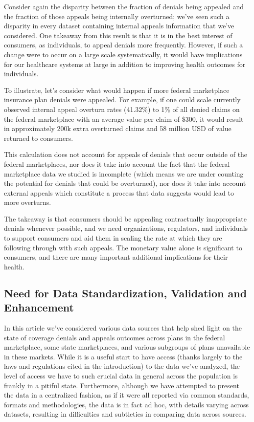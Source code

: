 \documentclass[12pt, a4paper,twoside]{report}
\theoremstyle{plain} %
\theoremstyle{definition} %
\theoremstyle{remark} %
\numberwithin{equation}{chapter}
\begin{document}
		Consider again the disparity between the fraction of denials being appealed and the fraction of those appeals being internally overturned; we've seen such a disparity in every dataset containing internal appeals information that we've considered. One takeaway from this result is that it is in the best interest of consumers, as individuals, to appeal denials more frequently. However, if such a change were to occur on a large scale systematically, it would have implications for our healthcare systems at large in addition to improving health outcomes for individuals.
		
		To illustrate, let's consider what would happen if more federal marketplace insurance plan denials were appealed. For example, if one could scale currently observed internal appeal overturn rates (41.32\%) to 1\% of all denied claims on the federal marketplace with an average value per claim of \$300, it would result in approximately 200k extra overturned claims and 58 million USD of value returned to consumers.
		
		This calculation does not account for appeals of denials that occur outside of the federal marketplaces, nor does it take into account the fact that the federal marketplace data we studied is incomplete (which means we are under counting the potential for denials that could be overturned), nor does it take into account external appeals which constitute a process that data suggests would lead to more overturns.
		
		The takeaway is that consumers should be appealing contractually inappropriate denials whenever possible, and we need organizations, regulators, and individuals to support consumers and aid them in scaling the rate at which they are following through with such appeals. The monetary value alone is significant to consumers, and there are many important additional implications for their health.
		
		\subsection{Need for Data Standardization, Validation and Enhancement}
		
		In this article we've considered various data sources that help shed light on the state of coverage denials and appeals outcomes across plans in the federal marketplace, some state marketplaces, and various subgroups of plans unavailable in these markets. While it is a useful start to have access (thanks largely to the laws and regulations cited in the introduction) to the data we've analyzed, the level of access we have to such crucial data in general across the population is frankly in a pitiful state. Furthermore, although we have attempted to present the data in a centralized fashion, as if it were all reported via common standards, formats and methodologies, the data is in fact ad hoc, with details varying across datasets, resulting in difficulties and subtleties in comparing data across sources.
		
\end{document}
